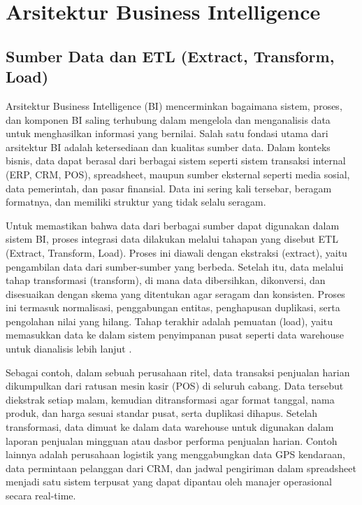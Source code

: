 \section{Arsitektur Business Intelligence}

\subsection{Sumber Data dan ETL (Extract, Transform, Load)}

Arsitektur Business Intelligence (BI) mencerminkan bagaimana sistem, proses, dan komponen BI saling terhubung dalam mengelola dan menganalisis data untuk menghasilkan informasi yang bernilai. Salah satu fondasi utama dari arsitektur BI adalah ketersediaan dan kualitas sumber data. Dalam konteks bisnis, data dapat berasal dari berbagai sistem seperti sistem transaksi internal (ERP, CRM, POS), spreadsheet, maupun sumber eksternal seperti media sosial, data pemerintah, dan pasar finansial. Data ini sering kali tersebar, beragam formatnya, dan memiliki struktur yang tidak selalu seragam.

Untuk memastikan bahwa data dari berbagai sumber dapat digunakan dalam sistem BI, proses integrasi data dilakukan melalui tahapan yang disebut ETL (Extract, Transform, Load). Proses ini diawali dengan ekstraksi (extract), yaitu pengambilan data dari sumber-sumber yang berbeda. Setelah itu, data melalui tahap transformasi (transform), di mana data dibersihkan, dikonversi, dan disesuaikan dengan skema yang ditentukan agar seragam dan konsisten. Proses ini termasuk normalisasi, penggabungan entitas, penghapusan duplikasi, serta pengolahan nilai yang hilang. Tahap terakhir adalah pemuatan (load), yaitu memasukkan data ke dalam sistem penyimpanan pusat seperti data warehouse untuk dianalisis lebih lanjut \cite{vassiliadis2009survey}.

Sebagai contoh, dalam sebuah perusahaan ritel, data transaksi penjualan harian dikumpulkan dari ratusan mesin kasir (POS) di seluruh cabang. Data tersebut diekstrak setiap malam, kemudian ditransformasi agar format tanggal, nama produk, dan harga sesuai standar pusat, serta duplikasi dihapus. Setelah transformasi, data dimuat ke dalam data warehouse untuk digunakan dalam laporan penjualan mingguan atau dasbor performa penjualan harian. Contoh lainnya adalah perusahaan logistik yang menggabungkan data GPS kendaraan, data permintaan pelanggan dari CRM, dan jadwal pengiriman dalam spreadsheet menjadi satu sistem terpusat yang dapat dipantau oleh manajer operasional secara real-time.


